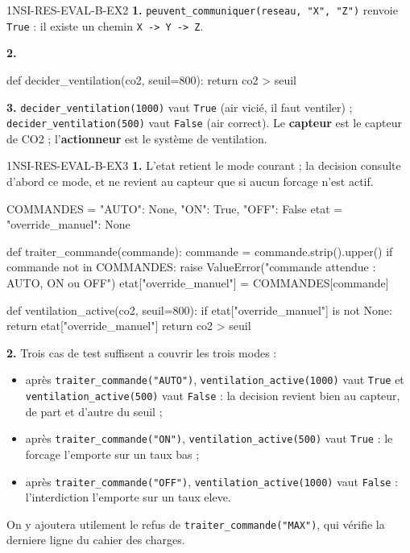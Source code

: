 \begin{corrige}{1NSI-RES-EVAL-B-EX2}
\textbf{1.} \lstinline{peuvent_communiquer(reseau, "X", "Z")} renvoie \lstinline{True} :
il existe un chemin \lstinline{X -> Y -> Z}.

\textbf{2.}
\begin{python}
def decider_ventilation(co2, seuil=800):
    return co2 > seuil
\end{python}

\textbf{3.} \lstinline{decider_ventilation(1000)} vaut \lstinline{True} (air vicié, il
faut ventiler) ; \lstinline{decider_ventilation(500)} vaut \lstinline{False} (air
correct). Le \textbf{capteur} est le capteur de CO2 ; l'\textbf{actionneur} est le système
de ventilation.
\end{corrige}

\begin{corrige}{1NSI-RES-EVAL-B-EX3}
\textbf{1.} L'etat retient le mode courant ; la decision consulte d'abord ce mode, et ne
revient au capteur que si aucun forcage n'est actif.

\begin{python}
COMMANDES = {"AUTO": None, "ON": True, "OFF": False}
etat = {"override_manuel": None}


def traiter_commande(commande):
    commande = commande.strip().upper()
    if commande not in COMMANDES:
        raise ValueError("commande attendue : AUTO, ON ou OFF")
    etat["override_manuel"] = COMMANDES[commande]


def ventilation_active(co2, seuil=800):
    if etat["override_manuel"] is not None:
        return etat["override_manuel"]
    return co2 > seuil
\end{python}

\textbf{2.} Trois cas de test suffisent a couvrir les trois modes :
\begin{itemize}
  \item après \lstinline{traiter_commande("AUTO")}, \lstinline{ventilation_active(1000)}
  vaut \lstinline{True} et \lstinline{ventilation_active(500)} vaut \lstinline{False} :
  la decision revient bien au capteur, de part et d'autre du seuil ;
  \item après \lstinline{traiter_commande("ON")}, \lstinline{ventilation_active(500)} vaut
  \lstinline{True} : le forcage l'emporte sur un taux bas ;
  \item après \lstinline{traiter_commande("OFF")}, \lstinline{ventilation_active(1000)}
  vaut \lstinline{False} : l'interdiction l'emporte sur un taux eleve.
\end{itemize}
On y ajoutera utilement le refus de \lstinline{traiter_commande("MAX")}, qui vérifie la
derniere ligne du cahier des charges.
\end{corrige}
